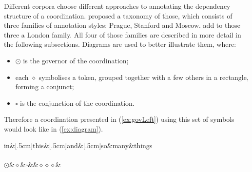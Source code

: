 Different corpora choose different approaches to annotating the dependency structure of a coordination. \cite{popel2013coordination} proposed a taxonomy of those, which consists of three families of annotation styles: Prague, Stanford and Moscow. \cite{prz:woz:23} add to those three a London family. All four of those families are described in more detail in the following subsections. Diagrams are used to better illustrate them, where:
\begin{itemize}
    \item $\odot$ is the governor of the coordination;
    \item each $\diamond$ symbolises a token, grouped together with a few others in a rectangle, forming a conjunct;
    \item $\square$ is the conjunction of the coordination.
\end{itemize}

Therefore a coordination presented in (\ref{ex:govLeft}) using this set of symbols would look like in (\ref{ex:diagram}).

\begin{exe}
    \ex
    \label{ex:diagram}
    \begin{dependency}
        \begin{deptext}
            in\&[.5cm]this\&[.5cm]and\&[.5cm]so\&many\&things\\
            \\
            $\odot$\&$\diamond$\&$\square$\&\&$\diamond\diamond\diamond$\&\\
        \end{deptext}
    \end{dependency}
\end{exe}






